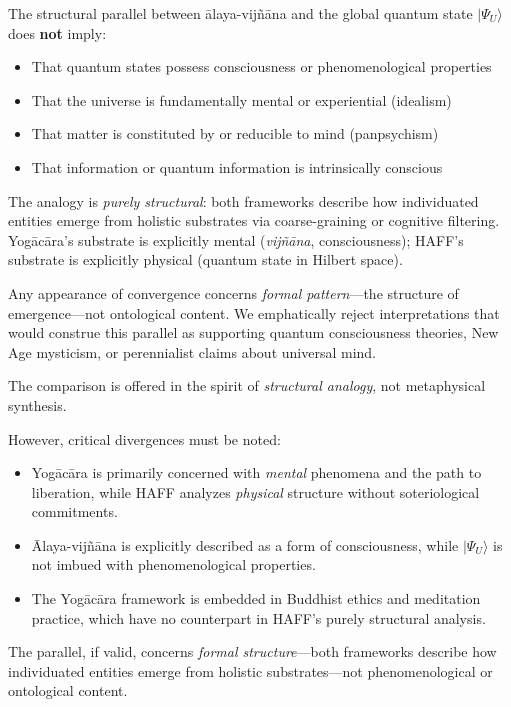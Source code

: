 \documentclass[11pt,a4paper]{article}
\begin{document}
\begin{tcolorbox}[colback=gray!5!white,colframe=black!75!black,title=\textbf{Critical Clarification: Against Panpsychism}]
The structural parallel between \=alaya-vijñ\=ana and the global quantum state $|\Psi_U\rangle$ does \textbf{not} imply:
\begin{itemize}
\item That quantum states possess consciousness or phenomenological properties
\item That the universe is fundamentally mental or experiential (idealism)
\item That matter is constituted by or reducible to mind (panpsychism)
\item That information or quantum information is intrinsically conscious
\end{itemize}

The analogy is \emph{purely structural}: both frameworks describe how individuated entities emerge from holistic substrates via coarse-graining or cognitive filtering. Yog\=ac\=ara's substrate is explicitly mental (\emph{vijñ\=ana}, consciousness); HAFF's substrate is explicitly physical (quantum state in Hilbert space).

Any appearance of convergence concerns \emph{formal pattern}—the structure of emergence—not ontological content. We emphatically reject interpretations that would construe this parallel as supporting quantum consciousness theories, New Age mysticism, or perennialist claims about universal mind.

The comparison is offered in the spirit of \emph{structural analogy}, not metaphysical synthesis.
\end{tcolorbox}

However, critical divergences must be noted:
\begin{itemize}
\item Yog\=ac\=ara is primarily concerned with \emph{mental} phenomena and the path to liberation, while HAFF analyzes \emph{physical} structure without soteriological commitments.
\item \=Alaya-vijñ\=ana is explicitly described as a form of consciousness, while $|\Psi_U\rangle$ is not imbued with phenomenological properties.
\item The Yog\=ac\=ara framework is embedded in Buddhist ethics and meditation practice, which have no counterpart in HAFF's purely structural analysis.
\end{itemize}

The parallel, if valid, concerns \emph{formal structure}—both frameworks describe how individuated entities emerge from holistic substrates—not phenomenological or ontological content.
\end{document}
